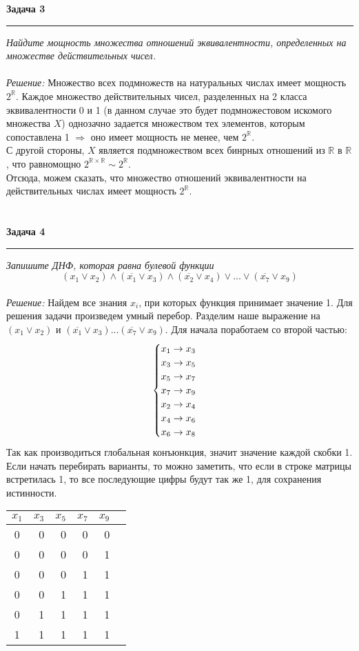 \documentclass[12pt,a4paper]{scrartcl}
\begin{document}
\textbf{Задача 3}
\medskip\hrule\medskip
\textsl{
Найдите мощность множества отношений эквивалентности, определенных на множестве действительных чисел.} \\ \\
\textit{Решение:}  Множество всех подмножеств на натуральных числах имеет мощность $2^{\mathbb{R}}$. Каждое множество действительных чисел, разделенных на 2 класса эквивалентности 0 и 1 (в данном случае это будет подмножестовом искомого множества  $X$)
однозачно задается множеством тех элементов, которым сопоставлена 1 $\Rightarrow$ оно имеет мощность не менее, чем $2^{\mathbb{R}}$. \\
С другой стороны, $X$ является подмножеством всех бинрных отношений из $\mathbb{R}$ в $\mathbb{R}$, что равномощно $2^{\mathbb{R} \times \mathbb{R}} \sim 2^{\mathbb{R}}$. \\
Отсюда, можем сказать, что множество отношений эквивалентности на действительных числах имеет мощность $2^{\mathbb{R}}$.
\\ \\ \\


\textbf{Задача 4}
\medskip\hrule\medskip
\textsl{
Запишите ДНФ, которая равна булевой функции}
$$
(x_1 \vee x_2) \wedge (\overline{x_1} \vee x_3) \wedge (\overline{x_2} \vee x_4) \vee ... \vee (\overline{x_7} \vee x_9)
$$ \\
\textit{Решение:} Найдем все знания $x_i$, при которых функция принимает значение 1. Для решения задачи произведем умный перебор. Разделим наше выражение на $(x_1 \vee x_2)$ и $(\overline{x_1} \vee x_3) ... (\overline{x_7} \vee x_9)$. Для начала поработаем со второй частью: 
\begin{equation*}
\begin{cases}
$$
x_1 \rightarrow x_3 \\
x_3 \rightarrow x_5 \\
x_5 \rightarrow x_7 \\
x_7 \rightarrow x_9 \\
x_2 \rightarrow x_4 \\
x_4 \rightarrow x_6 \\
x_6 \rightarrow x_8 
$$
\end{cases}
\end{equation*}
Так как производиться глобальная конъюнкция, значит значение каждой скобки 1. Если начать перебирать варианты, то можно заметить, что если в строке матрицы встретилась 1, то все последующие цифры будут так же 1, для сохранения истинности.
\begin{center}
	\begin{tabular}{crrrrr}
		$x_1$ & $x_3$ & $x_5$ & $x_7$ & $x_9$ \\
		\hline
		0 & 0 & 0 & 0 & 0 \\
		0 & 0 & 0 & 0 & 1 \\
		0 & 0 & 0 & 1 & 1 \\
		0 & 0 & 1 & 1 & 1 \\
		0 & 1 & 1 & 1 & 1 \\
		1 & 1 & 1 & 1 & 1 \\
	\end{tabular}
\end{center}
\end{document}
